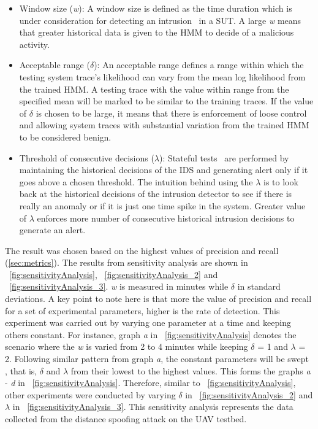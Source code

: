 \begin{itemize}
\item Window size (\textit{w}): A window size is defined as the time duration which is under consideration for detecting an intrusion~\cite{zohrevand2016hidden} in a \ac{SUT}. A large \textit{w} means that greater historical data is given to the \ac{HMM} to decide of a malicious activity.
\item Acceptable range ($\delta$): An acceptable range defines a range within which the testing system trace's likelihood can vary from the mean log likelihood from the trained \ac{HMM}. A testing trace with the value within range from the specified mean will be marked to be similar to the training traces. If the value of $\delta$ is chosen to be large, it means that there is enforcement of loose control and allowing system traces with substantial variation from the trained \ac{HMM} to be considered benign.
\item Threshold of consecutive decisions ($\lambda$): Stateful tests~\cite{urbina2016limiting} are performed by maintaining the historical decisions of the \ac{IDS} and generating alert only if it goes above a chosen threshold. The intuition behind using the $\lambda$ is to look back at the historical decisions of the intrusion detector to see if there is really an anomaly or if it is just one time spike in the system. Greater value of $\lambda$ enforces more number of consecutive historical intrusion decisions to generate an alert.
\end{itemize}

The result was chosen based on the highest values of precision and recall (\autoref{sec:metrics}). The results from sensitivity analysis are shown in ~\autoref{fig:sensitivityAnalysis}, ~\autoref{fig:sensitivityAnalysis_2} and ~\autoref{fig:sensitivityAnalysis_3}. \textit{w} is measured in minutes while $\delta$ in standard deviations. A key point to note here is that more the value of precision and recall for a set of experimental parameters, higher is the rate of detection. This experiment was carried out by varying one parameter at a time and keeping others constant. For instance, graph \textit{a} in ~\autoref{fig:sensitivityAnalysis} denotes the scenario where the \textit{w} is varied from 2 to 4 minutes while keeping $\delta$ = 1 and $\lambda$ = 2. Following similar pattern from  graph \textit{a}, the constant parameters will be swept , that is, $\delta$ and $\lambda$ from their lowest to the highest values. This forms the graphs \textit{a} - \textit{d} in ~\autoref{fig:sensitivityAnalysis}. Therefore, similar to ~\autoref{fig:sensitivityAnalysis}, other experiments were conducted by varying $\delta$ in ~\autoref{fig:sensitivityAnalysis_2} and $\lambda$ in ~\autoref{fig:sensitivityAnalysis_3}. This sensitivity analysis represents the data collected from the distance spoofing attack on the \ac{UAV} testbed. 

